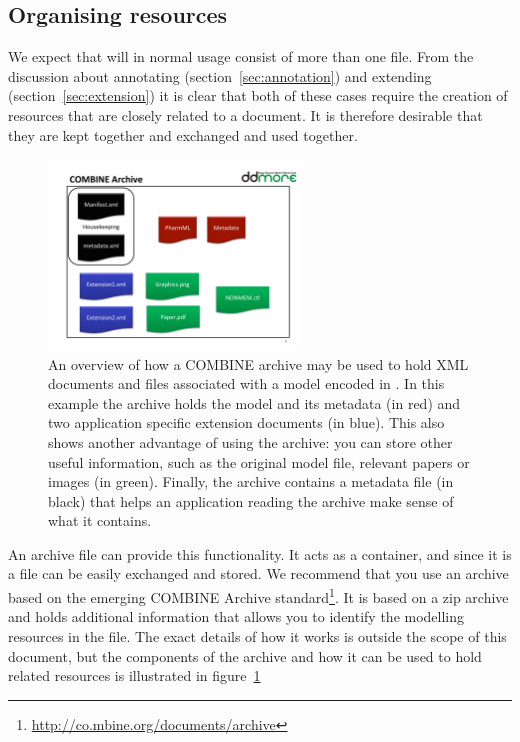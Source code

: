 \subsection{Organising \pharmml resources}
\label{sec:pharmml-archive}

We expect that \pharmml will in normal usage consist of more than one
file. From the discussion about annotating
(section~\ref{sec:annotation}) and extending
(section~\ref{sec:extension}) \pharmml it is clear that both of these
cases require the creation of resources that are closely
related to a \pharmml document. It is therefore desirable that they
are kept together and exchanged and used together.

\begin{figure}[htb]
\centering
  \includegraphics[width=0.6\textwidth]{Figures/AchiveOverview}
  \caption{An overview of how a COMBINE archive may be used to hold
    XML documents and files associated with a model encoded in
    \pharmml. In this example the archive holds the model and its
    metadata (in red) and two application specific extension
    documents (in blue). This also shows another advantage of using
    the archive: you can store other useful information, such as the
    original model file, relevant papers or images (in
    green). Finally, the archive contains a metadata file (in black)
    that helps an application reading the archive make sense of what
    it contains.}
  \label{fig:moml-archive-overview}
\end{figure}

An archive file can provide this functionality. It acts as a
container, and since it is a file can be easily exchanged and
stored. We recommend that you use an archive based on the emerging
COMBINE Archive
standard\footnote{\url{http://co.mbine.org/documents/archive}}. It is
based on a zip archive and holds additional information that allows
you to identify the modelling resources in the file. The exact details
of how it works is outside the scope of this document, but the
components of the archive and how it can be used to hold \pharmml
related resources is illustrated in
figure~\ref{fig:moml-archive-overview}

